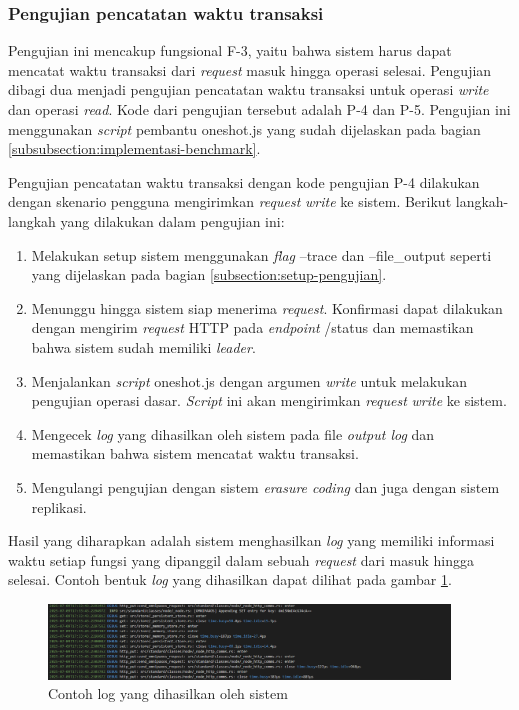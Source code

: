 \subsubsection{Pengujian pencatatan waktu transaksi}
\label{subsubsection:pengujian-pencatatan-waktu-transaksi}

Pengujian ini mencakup fungsional F-3, yaitu bahwa sistem harus dapat mencatat waktu transaksi dari \textit{request} masuk hingga operasi selesai. Pengujian dibagi dua menjadi pengujian pencatatan waktu transaksi untuk operasi \textit{write} dan operasi \textit{read}. Kode dari pengujian tersebut adalah P-4 dan P-5. Pengujian ini menggunakan \textit{script} pembantu oneshot.js yang sudah dijelaskan pada bagian \ref{subsubsection:implementasi-benchmark}.

Pengujian pencatatan waktu transaksi dengan kode pengujian P-4 dilakukan dengan skenario pengguna mengirimkan \textit{request} \textit{write} ke sistem. Berikut langkah-langkah yang dilakukan dalam pengujian ini:

\begin{enumerate}
  \item Melakukan setup sistem menggunakan \textit{flag} --trace dan --file\_output seperti yang dijelaskan pada bagian \ref{subsection:setup-pengujian}.
  \item Menunggu hingga sistem siap menerima \textit{request}. Konfirmasi dapat dilakukan dengan mengirim \textit{request} HTTP pada \textit{endpoint} /status dan memastikan bahwa sistem sudah memiliki \textit{leader}.
  \item Menjalankan \textit{script} oneshot.js dengan argumen \textit{write} untuk melakukan pengujian operasi dasar. \textit{Script} ini akan mengirimkan \textit{request} \textit{write} ke sistem.
  \item Mengecek \textit{log} yang dihasilkan oleh sistem pada file \textit{output log} dan memastikan bahwa sistem mencatat waktu transaksi.
  \item Mengulangi pengujian dengan sistem \textit{erasure coding} dan juga dengan sistem replikasi.
\end{enumerate}

Hasil yang diharapkan adalah sistem menghasilkan \textit{log} yang memiliki informasi waktu setiap fungsi yang dipanggil dalam sebuah \textit{request} dari masuk hingga selesai. Contoh bentuk \textit{log} yang dihasilkan dapat dilihat pada gambar \ref{fig:log-trace}.

\begin{figure}[ht]
    \centering
    \includegraphics[width=0.95\textwidth]{resources/chapter-4/log-trace.png}
    \caption{Contoh log yang dihasilkan oleh sistem}
    \label{fig:log-trace}
\end{figure}

